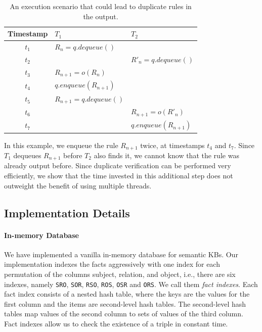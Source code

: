 \begin{table}
\centering
 \begin{tabular}{c|l|l}
  Timestamp & $T_1$ & $T_2$\\  \hline
  $t_1$ & $R_n = q.dequeue()$	&  \\
  $t_2$ & & $R'_n = q.dequeue()$ \\
  $t_3$ & $R_{n+1} = o(R_n)$  & \\
  $t_4$ & $q.enqueue(R_{n+1})$  & \\
  $t_5$ & $R_{n+1} = q.dequeue()$ & \\
  $t_6$ & & $R_{n+1} = o(R'_n)$ \\
  $t_7$ & & $q.enqueue(R_{n+1})$ \\
\end{tabular}
\caption{An execution scenario that could lead to duplicate rules in the output.}\label{tab:duplicates}
\end{table}

In this example, we enqueue the rule $R_{n+1}$ twice, at timestamps $t_4$ and $t_7$. 
Since $T_1$ dequeues $R_{n+1}$ before $T_2$ also finds it, 
we cannot know that the rule was already output before. 
Since duplicate verification
can be performed very efficiently, we show that the time invested in this additional step does not  
outweight the benefit of using multiple threads.



\subsection{Implementation Details}
\label{subsec:implementation}

\paragraph{In-memory Database}
We have implemented a vanilla in-memory database for semantic KBs.
Our implementation indexes the facts aggressively with one index for each permutation of 
the columns subject, relation, and object, i.e., there are six indexes, namely \texttt{SRO}, \texttt{SOR}, 
\texttt{RSO}, \texttt{ROS}, \texttt{OSR} and \texttt{ORS}. We call them \emph{fact indexes}.
Each fact index consists of a nested hash table, where the keys are the values for the first column and the items
are second-level hash tables. The second-level hash tables map values of the second column
to sets of values of the third column. 
Fact indexes allow us to check the existence of a triple in constant time.
% 

